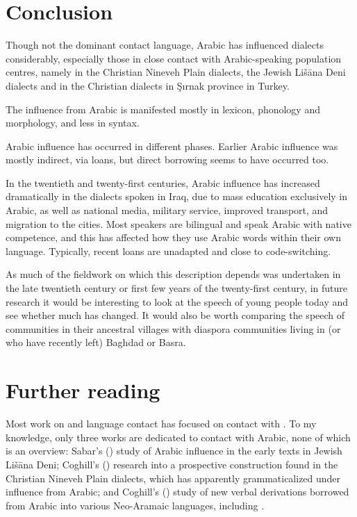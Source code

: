 \documentclass[output=paper]{langsci/langscibook}
\begin{document}
\section{Conclusion}

Though not the dominant contact language, Arabic has influenced  dialects considerably, especially those in close contact with Arabic-speaking population centres, namely in the Christian Nineveh Plain dialects, the Jewish Lišāna Deni dialects and in the Christian dialects in Şırnak province in Turkey.

The influence from Arabic is manifested mostly in lexicon, phonology and morphology, and less in syntax.

Arabic influence has occurred in different phases. Earlier Arabic influence was mostly indirect, via  loans, but direct borrowing seems to have occurred too.

In the twentieth and twenty-first centuries, Arabic influence has increased dramatically in the dialects spoken in Iraq, due to mass education exclusively in Arabic, as well as national media, military service, improved transport, and migration to the  cities. Most  speakers are bilingual and speak Arabic with native competence, and this has affected how they use Arabic words within their own language. Typically, recent loans are unadapted and close to {code-switching}.

As much of the fieldwork on which this description depends was undertaken in the late twentieth century or first few years of the twenty-first century, in {future} research it would be interesting to look at the speech of young people today and see whether much has changed. It would also be worth comparing the speech of communities in their ancestral villages with {diaspora} communities living in (or who have recently left) Baghdad or Basra.

\section*{Further reading}

Most work on  and language contact has focused on contact with . To my knowledge, only three works are dedicated to contact with Arabic, none of which is an overview: Sabar's (\citeyear{Sabar1984}) study of Arabic influence in the early texts in Jewish Lišāna Deni; Coghill’s (\citeyear{Coghill2010,Coghill2012}) research into a {prospective} construction found in the Christian Nineveh Plain dialects, which has apparently grammaticalized under influence from Arabic; and Coghill's (\citeyear{Coghill2015}) study of new verbal derivations borrowed from Arabic into various Neo-Aramaic languages, including .
\end{document}
